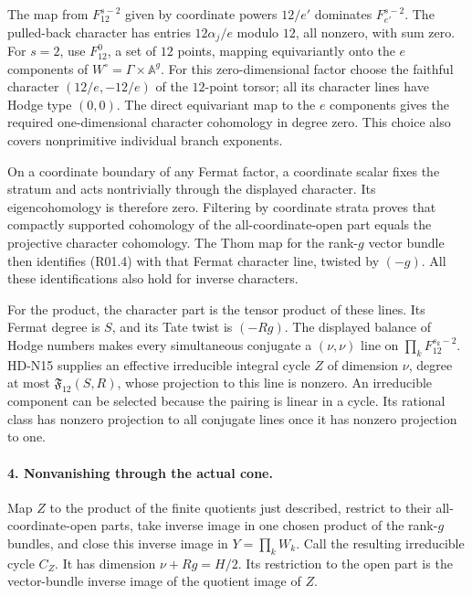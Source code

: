 The map from $F_{12}^{s-2}$ given by coordinate powers $12/e'$
dominates $F_{e'}^{s-2}$. The pulled-back character has entries
$12\alpha_j/e$ modulo $12$, all nonzero, with sum zero.
For $s=2$, use $F_{12}^{0}$, a set of $12$ points, mapping equivariantly
onto the $e$ components of $W^\circ=\Gamma\times\mathbb A^g$.
For this zero-dimensional factor choose the faithful character
$(12/e,-12/e)$ of the $12$-point torsor; all its character lines have
Hodge type $(0,0)$. The direct equivariant map to the $e$ components
gives the required one-dimensional character cohomology in degree zero.
This choice also covers nonprimitive individual branch exponents.

On a coordinate boundary of any Fermat factor, a coordinate scalar
fixes the stratum and acts nontrivially through the displayed
character. Its eigencohomology is therefore zero. Filtering by
coordinate strata proves that compactly supported cohomology of
the all-coordinate-open part equals the projective character
cohomology. The Thom map for the rank-$g$ vector bundle then
identifies (R01.4) with that Fermat character line, twisted by $(-g)$.
All these identifications also hold for inverse characters.

For the product, the character part is the tensor product of these
lines. Its Fermat degree is $S$, and its Tate twist is $(-Rg)$.
The displayed balance of Hodge numbers makes every simultaneous
conjugate a $(\nu,\nu)$ line on $\prod_kF_{12}^{s_k-2}$.
HD-N15 supplies an effective irreducible integral cycle $Z$ of
dimension $\nu$, degree at most $\mathfrak F_{12}(S,R)$, whose
projection to this line is nonzero. An irreducible component can
be selected because the pairing is linear in a cycle. Its rational
class has nonzero projection to all conjugate lines once it has
nonzero projection to one.

\paragraph{4. Nonvanishing through the actual cone.}
Map $Z$ to the product of the finite quotients just described,
restrict to their all-coordinate-open parts, take inverse image in
one chosen product of the rank-$g$ bundles, and close this inverse
image in $Y=\prod_kW_k$. Call the resulting irreducible cycle $C_Z$.
It has dimension $\nu+Rg=H/2$. Its restriction to the open part is
the vector-bundle inverse image of the quotient image of $Z$.

